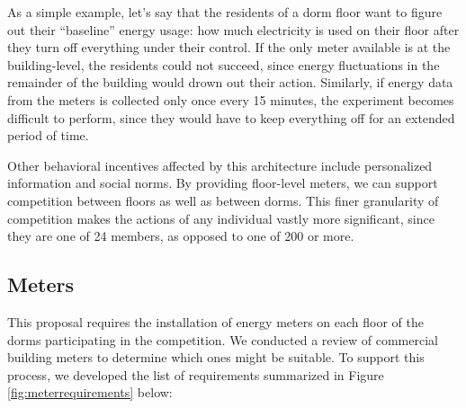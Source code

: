 \documentclass[11pt]{article}
\begin{document}
As a simple example, let's say that the residents of a dorm floor want to
figure out their ``baseline'' energy usage: how much electricity is used on
their floor after they turn off everything under their control.  If the
only meter available is at the building-level, the residents could not
succeed, since energy fluctuations in the remainder of the building would
drown out their action.  Similarly, if energy data from the meters is collected
only once every 15 minutes, the experiment becomes difficult to perform,
since they would have to keep everything off for an extended period of
time.  

Other behavioral incentives affected by this architecture include
personalized information and social norms.  By providing floor-level
meters, we can support competition between floors as well as between dorms.
This finer granularity of competition makes the actions of any individual
vastly more significant, since they are one of 24 members, as opposed to
one of 200 or more.

\subsection{Meters}
\label{sec:meters}

This proposal requires the installation of energy meters on each floor of
the dorms participating in the competition.  We conducted a review of
commercial building meters to determine which ones might be
suitable.  To support this process, we developed the list of
requirements summarized in Figure \ref{fig:meterrequirements} below:
\end{document}
